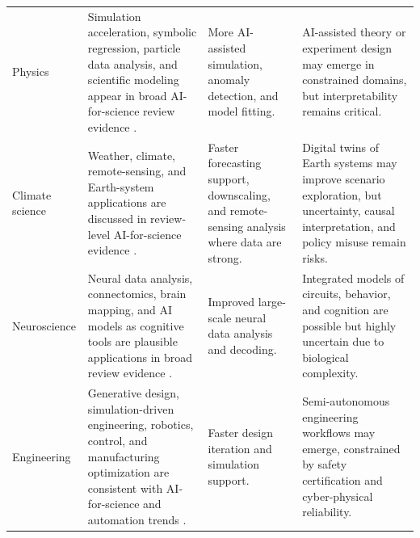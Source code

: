 \documentclass[12pt]{article}
\begin{document}
\begin{longtable}{p{2.5cm}p{4.0cm}p{4.0cm}p{4.0cm}}
Physics & Simulation acceleration, symbolic regression, particle data analysis, and scientific modeling appear in broad AI-for-science review evidence \cite{ref1}. & More AI-assisted simulation, anomaly detection, and model fitting. & AI-assisted theory or experiment design may emerge in constrained domains, but interpretability remains critical. \\
Climate science & Weather, climate, remote-sensing, and Earth-system applications are discussed in review-level AI-for-science evidence \cite{ref1}. & Faster forecasting support, downscaling, and remote-sensing analysis where data are strong. & Digital twins of Earth systems may improve scenario exploration, but uncertainty, causal interpretation, and policy misuse remain risks. \\
Neuroscience & Neural data analysis, connectomics, brain mapping, and AI models as cognitive tools are plausible applications in broad review evidence \cite{ref1}. & Improved large-scale neural data analysis and decoding. & Integrated models of circuits, behavior, and cognition are possible but highly uncertain due to biological complexity. \\
Engineering & Generative design, simulation-driven engineering, robotics, control, and manufacturing optimization are consistent with AI-for-science and automation trends \cite{ref1,ref4}. & Faster design iteration and simulation support. & Semi-autonomous engineering workflows may emerge, constrained by safety certification and cyber-physical reliability. \\
\bottomrule
\end{longtable}
\end{document}
